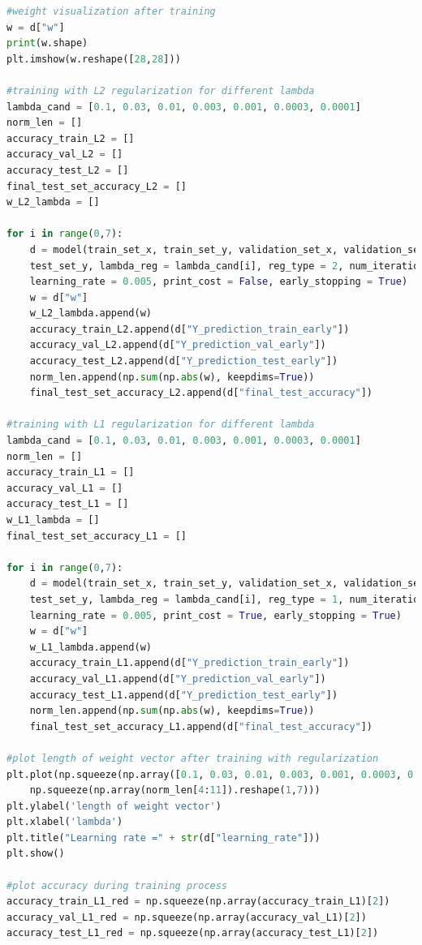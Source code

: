\documentclass{article} %
\begin{document}
{\begin{lstlisting}[language=Python]
#weight visualization after training
w = d["w"]
print(w.shape)
plt.imshow(w.reshape([28,28]))

#training with L2 regularization for different lambda
lambda_cand = [0.1, 0.03, 0.01, 0.003, 0.001, 0.0003, 0.0001]
norm_len = []
accuracy_train_L2 = []
accuracy_val_L2 = []
accuracy_test_L2 = []
final_test_set_accuracy_L2 = []
w_L2_lambda = []

for i in range(0,7):
    d = model(train_set_x, train_set_y, validation_set_x, validation_set_y, test_set_x, 
	test_set_y, lambda_reg = lambda_cand[i], reg_type = 2, num_iterations = 5000, 
	learning_rate = 0.005, print_cost = False, early_stopping = True)
    w = d["w"]
    w_L2_lambda.append(w)
    accuracy_train_L2.append(d["Y_prediction_train_early"])
    accuracy_val_L2.append(d["Y_prediction_val_early"])
    accuracy_test_L2.append(d["Y_prediction_test_early"])
    norm_len.append(np.sum(np.abs(w), keepdims=True))
    final_test_set_accuracy_L2.append(d["final_test_accuracy"])

#training with L1 regularization for different lambda
lambda_cand = [0.1, 0.03, 0.01, 0.003, 0.001, 0.0003, 0.0001]
norm_len = []
accuracy_train_L1 = []
accuracy_val_L1 = []
accuracy_test_L1 = []
w_L1_lambda = []
final_test_set_accuracy_L1 = []

for i in range(0,7):
    d = model(train_set_x, train_set_y, validation_set_x, validation_set_y, test_set_x, 
	test_set_y, lambda_reg = lambda_cand[i], reg_type = 1, num_iterations = 5000, 
	learning_rate = 0.005, print_cost = True, early_stopping = True)
    w = d["w"]
    w_L1_lambda.append(w)
    accuracy_train_L1.append(d["Y_prediction_train_early"])
    accuracy_val_L1.append(d["Y_prediction_val_early"])
    accuracy_test_L1.append(d["Y_prediction_test_early"])
    norm_len.append(np.sum(np.abs(w), keepdims=True))
    final_test_set_accuracy_L1.append(d["final_test_accuracy"])

#plot length of weight vector after training with regularization
plt.plot(np.squeeze(np.array([0.1, 0.03, 0.01, 0.003, 0.001, 0.0003, 0.0001]).reshape(1,7)),
	np.squeeze(np.array(norm_len[4:11]).reshape(1,7)))
plt.ylabel('length of weight vector')
plt.xlabel('lambda')
plt.title("Learning rate =" + str(d["learning_rate"]))
plt.show()

#plot accuracy during training process
accuracy_train_L1_red = np.squeeze(np.array(accuracy_train_L1)[2])
accuracy_val_L1_red = np.squeeze(np.array(accuracy_val_L1)[2])
accuracy_test_L1_red = np.squeeze(np.array(accuracy_test_L1)[2])


\end{lstlisting}}
\end{document}
